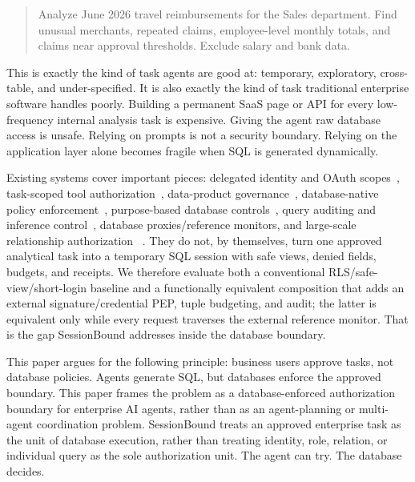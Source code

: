 \documentclass[journal]{IEEEtran}
\begin{document}
\begin{quote}
Analyze June 2026 travel reimbursements for the Sales department. Find
unusual merchants, repeated claims, employee-level monthly totals, and
claims near approval thresholds. Exclude salary and bank data.
\end{quote}

This is exactly the kind of task agents are good at: temporary,
exploratory, cross-table, and under-specified. It is also exactly the
kind of task traditional enterprise software handles poorly. Building a
permanent SaaS page or API for every low-frequency internal analysis
task is expensive. Giving the agent raw database access is unsafe.
Relying on prompts is not a security boundary. Relying on the
application layer alone becomes fragile when SQL is generated
dynamically.

Existing systems cover important pieces: delegated identity and OAuth
scopes~\cite{rfc6749,south2025authenticateddelegation}, task-scoped tool
authorization~\cite{sharma2026pauth}, data-product
governance~\cite{tonnarelli2026dataproductmcp,mcp2025specification},
database-native policy enforcement~\cite{postgresql2026rowsecurity,oracle2026vpd,oracle2026deepdatasecuritydocs},
purpose-based database controls~\cite{agrawal2002hippocratic,byun2008purpose},
query auditing and inference control~\cite{kleinberg2000auditing,nabar2006robustness},
database proxies/reference monitors, and large-scale relationship authorization
~\cite{pang2019zanzibar}.
They do not, by themselves, turn one approved analytical task into a
temporary SQL session with safe views, denied fields, budgets, and
receipts. We therefore evaluate both a conventional RLS/safe-view/short-login
baseline and a functionally equivalent composition that adds an external
signature/credential PEP, tuple budgeting, and audit; the latter is equivalent
only while every request traverses the external reference monitor. That is the
gap SessionBound addresses inside the database boundary.

This paper argues for the following principle: business users approve
tasks, not database policies. Agents generate SQL, but databases enforce
the approved boundary. This paper frames the problem as a
database-enforced authorization boundary for enterprise AI agents,
rather than as an agent-planning or multi-agent coordination problem.
SessionBound treats an approved enterprise task as the unit of database
execution, rather than treating identity, role, relation, or individual
query as the sole authorization unit. The agent can try. The database
decides.
\end{document}
